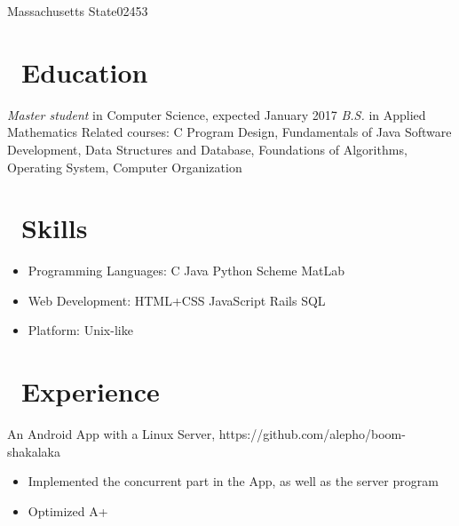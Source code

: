 \documentclass{resume}
\begin{document}


\address{116 Russell Street}{Massachusetts State}{02453}
 
\section{\faGraduationCap\ Education}
\textit{Master student} in Computer Science, expected January 2017
\textit{B.S.} in Applied Mathematics
\newline
Related courses: C Program Design, Fundamentals of Java Software Development, Data Structures and Database, Foundations of Algorithms, Operating System, Computer Organization

\section{\faCogs\ Skills}
\begin{itemize}[parsep=0.5ex]
  \item Programming Languages: C Java Python Scheme MatLab
  \item Web Development: HTML+CSS JavaScript Rails SQL
  \item Platform: Unix-like
\end{itemize}


\section{\faUsers\ Experience}
An Android App with a Linux Server, https://github.com/alepho/boom-shakalaka
\begin{itemize}
  \item Implemented the concurrent part in the App, as well as the server program
  \item Optimized A+
\end{itemize}
\end{document}

